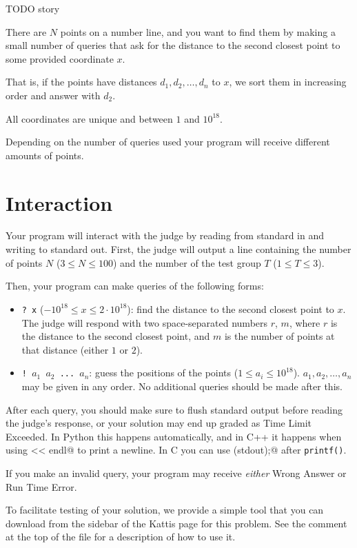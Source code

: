 TODO story

There are $N$ points on a number line, and you want to find them by making a small number of queries that ask for the distance to the second closest point to some provided coordinate $x$.

That is, if the points have distances $d_1, d_2, \ldots, d_n$ to $x$, we sort them in increasing order and answer with $d_2$.

All coordinates are unique and between $1$ and $10^{18}$.

Depending on the number of queries used your program will receive different amounts of points.

\section*{Interaction}
Your program will interact with the judge by reading from standard in and writing to standard out.
First, the judge will output a line containing the number of points $N$ ($3 \le N \le 100$) and the number of the test group $T$ ($1 \le T \le 3$).

Then, your program can make queries of the following forms:

\begin{itemize}
  \item \texttt{? x} ($-10^{18} \le x \le 2\cdot 10^{18}$): find the distance to the second closest point to $x$.
    The judge will respond with two space-separated numbers $r$, $m$,
    where $r$ is the distance to the second closest point, and $m$ is the number of points at that distance (either $1$ or $2$).
  \item \texttt{! $a_1$ $a_2$ ... $a_n$}: guess the positions of the points ($1 \le a_i \le 10^{18}$).
    $a_1, a_2, \ldots, a_n$ may be given in any order.
    No additional queries should be made after this.
\end{itemize}

After each query, you should make sure to flush standard output before reading the judge's response, or your solution may end up graded as Time Limit Exceeded.
In Python this happens automatically, and in C++ it happens when using \verb@cout << endl@ to print a newline.
In C you can use \verb@fflush(stdout);@ after \texttt{printf()}.

If you make an invalid query, your program may receive \emph{either} Wrong Answer or Run Time Error.

To facilitate testing of your solution, we provide a simple tool that you can download from the sidebar of the Kattis page for this problem.
See the comment at the top of the file for a description of how to use it.

